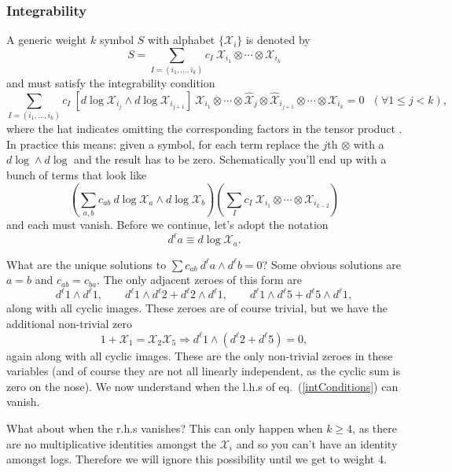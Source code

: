 \documentclass[12pt]{article}
\def\x{\mathcal{X}}
\def\dl{d^{\ell}}
\begin{document}
\subsubsection*{Integrability}
A generic weight $k$ symbol $S$ with alphabet $\{\x_i\}$ is denoted by 
\begin{equation}
	S = \sum_{I=(i_1,\ldots,i_k)} c_I ~\x_{i_1}\otimes \cdots \otimes \x_{i_k}
\end{equation}
and must satisfy the integrability condition 
\begin{equation}
	\sum_{I=(i_1,\ldots,i_k)} c_I~[d\log \x_{i_j} \wedge d\log \x_{i_{j+1}}]~\x_{i_1}\otimes\cdots\otimes\hat{\x}_j\otimes\hat{\x}_{i_{j+1}}\otimes\cdots\otimes\x_{i_k} = 0~~~(\forall 1\le j< k),
\end{equation}
where the hat indicates omitting the corresponding factors in the tensor product \cite{Duhr}. In practice this means: given a symbol, for each term replace the $j$th $\otimes$ with a $d\log \wedge d\log$ and the result has to be zero. Schematically you'll end up with a bunch of terms that look like
\begin{equation}\label{intConditions}
	\left(\sum_{a,b} c_{ab}~ d\log \x_a \wedge d\log \x_b\right)\left(\sum_{I} c_I~ \x_{i_1}\otimes\cdots\otimes\x_{i_{k-2}}\right)
\end{equation}
and each must vanish. Before we continue, let's adopt the notation
\begin{equation}
	\dl a \equiv d\log \x_a.
\end{equation}

What are the unique solutions to $\sum c_{ab}~ \dl a \wedge \dl b=0$? Some obvious solutions are $a=b$ and $c_{ab} = c_{ba}$. 
The only adjacent zeroes of this form are
\begin{equation}
 	\dl1\wedge \dl1, \qquad \dl1 \wedge \dl2+\dl2 \wedge \dl1,\qquad \dl1 \wedge \dl5+\dl5 \wedge \dl1,
\end{equation} 
along with all cyclic images. These zeroes are of course trivial, but we have the additional non-trivial zero
\begin{equation}
	1+\x_1 = \x_2 \x_5 \Rightarrow \dl1 \wedge (\dl2 + \dl5)=0,
\end{equation}
again along with all cyclic images. These are the only non-trivial zeroes in these variables (and of course they are not all linearly independent, as the cyclic sum is zero on the nose). We now understand when the l.h.s of eq.~(\ref{intConditions}) can vanish. 

What about when the r.h.s vanishes? This can only happen when $k\ge4$, as there are no multiplicative identities amongst the $\x_i$ and so you can't have an identity amongst logs. Therefore we will ignore this possibility until we get to weight 4. 
\end{document}
